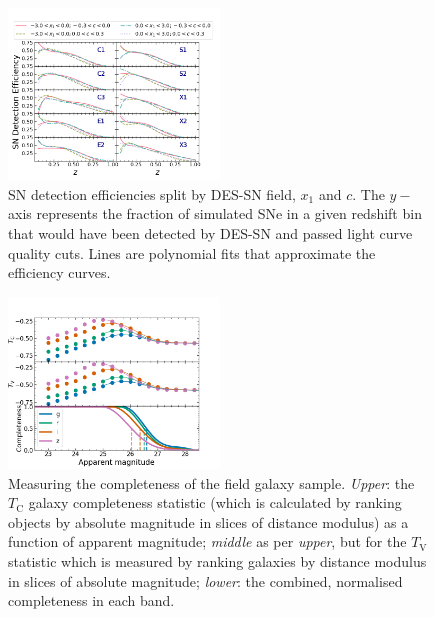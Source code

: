 \documentclass[fleqn,usenatbib]{mnras}
\begin{document}
\begin{figure}
    \centering
    \includegraphics[width=0.5\textwidth]{figs/SN_efficiencies_z_x1_c.png}
    \caption{ SN detection efficiencies split by DES-SN field, $x_1$ and $c$. The $y-$axis represents the fraction of simulated SNe in a given redshift bin that would have been detected by DES-SN and passed light curve quality cuts. Lines are polynomial fits that approximate the efficiency curves. 
    \label{fig:SN_efficiency}}
\end{figure}


\begin{figure}
    \centering
    \includegraphics[width=0.5\textwidth]{figs/completeness_combined.png}
    \caption{Measuring the completeness of the field galaxy sample. \textit{Upper}: the $T_{\mathrm{C}}$ galaxy completeness statistic (which is calculated by ranking objects by absolute magnitude in slices of distance modulus) as a function of apparent magnitude; \textit{middle} as per \textit{upper}, but for the $T_{\mathrm{V}}$ statistic which is measured by ranking galaxies by distance modulus in slices of absolute magnitude; \textit{lower}: the combined, normalised completeness in each band.  
    \label{fig:completeness}}
\end{figure}
\end{document}

